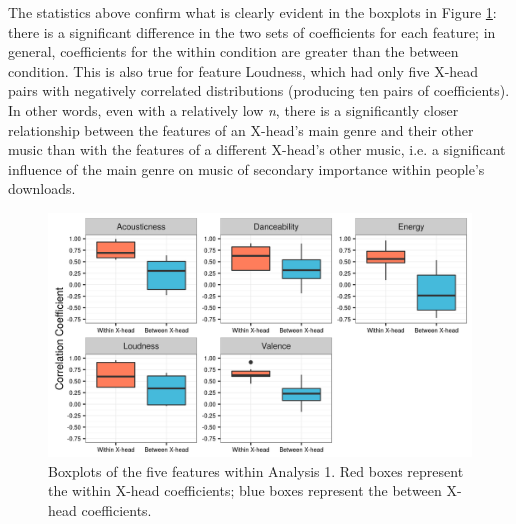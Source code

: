 \documentclass[a4paper]{article}
\begin{document}
The statistics above confirm what is clearly evident in the boxplots in Figure \ref{Analysis_1_Boxplots}: there is a significant difference in the two sets of coefficients for each feature; in general, coefficients for the within condition are greater than the between condition. This is also true for feature Loudness, which had only five X-head pairs with negatively correlated distributions (producing ten pairs of coefficients). In other words, even with a relatively low \textit{n}, there is a significantly closer relationship between the features of an X-head’s main genre and their other music than with the features of a different X-head’s other music, i.e. a significant influence of the main genre on music of secondary importance within people’s downloads.

\begin{figure}[h!]
\centering
\includegraphics[width=\linewidth]{feature_BoxPlots.png}
\caption[Boxplot Feature Significance]{Boxplots of the five features within Analysis 1. Red boxes represent the within X-head coefficients; blue boxes represent the between X-head coefficients.}
\label{Analysis_1_Boxplots}
\end{figure}
\end{document}
